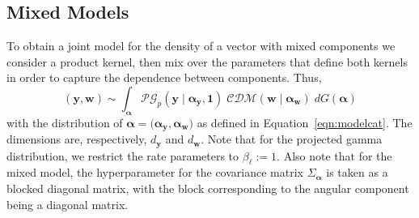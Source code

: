 \subsection{Mixed Models}
To obtain a joint model for the density of a vector with mixed components
    we consider a product kernel, then mix over the parameters that define 
    both kernels in order to capture the dependence between components. Thus,
    \begin{equation}
        \label{model:mixed}
        (\bm{y},\bm{w})\sim \int_{\bm{\alpha}}\mathcal{PG}_{p}
            (\bm{y}\mid\bm{\alpha}_{\bm{y}}, \bm{1})
        \;\mathcal{CDM}(\bm{w}\mid\bm{\alpha}_{\bm{w}})\;dG(\bm{\alpha})
    \end{equation}
  with the distribution of $\bm{\alpha}=(\bm{\alpha_\bm{y},\bm{\alpha_\bm{w}})}$ as
    defined in Equation~\ref{eqn:modelcat}. The dimensions are, respectively, 
    $d_{\bm{y}}$ and $d_{\bm{w}}$. Note that for 
    the projected gamma distribution, we restrict the rate parameters 
    to $\beta_{\ell} := 1$.  Also note that for the mixed model, the hyperparameter 
    for the covariance matrix $\Sigma_{\bm{\alpha}}$ is taken as a blocked diagonal 
    matrix, with the block corresponding to the angular component being a 
    diagonal matrix.


